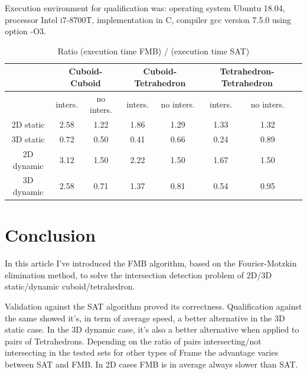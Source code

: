 \documentclass[12pt, a4paper]{article}
\begin{document}
\begin{itemize}
Execution environment for qualification was: operating system Ubuntu 18.04, processor Intel i7-8700T, implementation in C, compiler gcc version 7.5.0 using option -O3.

\begin{table}[htp]
\small
\begin{center}
\begin{tabular}{|c|c|c|c|c|c|c|c|}
\hline
 & \multicolumn{2}{|c|}{Cuboid-Cuboid} & \multicolumn{2}{|c|}{Cuboid-Tetrahedron} & \multicolumn{2}{|c|}{Tetrahedron-Tetrahedron}\\
\hline
 & inters. & no inters. & inters. & no inters. & inters. & no inters.\\
\hline
2D static & {\color[rgb]{1.0,0.0,0.0}2.58} & {\color[rgb]{1.0,0.0,0.0}1.22} & {\color[rgb]{1.0,0.0,0.0}1.86} & {\color[rgb]{1.0,0.0,0.0}1.29} & {\color[rgb]{1.0,0.0,0.0}1.33} & {\color[rgb]{1.0,0.0,0.0}1.32}\\
\hline
3D static & {\color[rgb]{0.0,0.0,1.0}0.72} & {\color[rgb]{0.0,0.0,1.0}0.50} & {\color[rgb]{0.0,0.0,1.0}0.41} & {\color[rgb]{0.0,0.0,1.0}0.66} & {\color[rgb]{0.0,0.0,1.0}0.24} & {\color[rgb]{0.0,0.0,1.0}0.89}\\
\hline
2D dynamic & {\color[rgb]{1.0,0.0,0.0}3.12} & {\color[rgb]{1.0,0.0,0.0}1.50} & {\color[rgb]{1.0,0.0,0.0}2.22} & {\color[rgb]{1.0,0.0,0.0}1.50} & {\color[rgb]{1.0,0.0,0.0}1.67} & {\color[rgb]{1.0,0.0,0.0}1.50}\\
\hline
3D dynamic & {\color[rgb]{1.0,0.0,0.0}2.58} & {\color[rgb]{0.0,0.0,1.0}0.71} & {\color[rgb]{1.0,0.0,0.0}1.37} & {\color[rgb]{0.0,0.0,1.0}0.81} & {\color[rgb]{0.0,0.0,1.0}0.54} & {\color[rgb]{0.0,0.0,1.0}0.95}\\
\hline
\end{tabular}
\end{center}
\caption{Ratio (execution time FMB) / (execution time SAT)}
\label{tbl:ratio}
\end{table}

\section{Conclusion}

In this article I've introduced the FMB algorithm, based on the Fourier-Motzkin elimination method, to solve the intersection detection problem of 2D/3D static/dynamic cuboid/tetrahedron.

Validation against the SAT algorithm proved its correctness. Qualification against the same showed it's, in term of average speed, a better alternative in the 3D static case. In the 3D dynamic case, it's also a better alternative when applied to pairs of Tetrahedrons. Depending on the ratio of pairs intersecting/not intersecting in the tested sets for other types of Frame the advantage varies between SAT and FMB. In 2D cases FMB is in average always slower than SAT.


\end{itemize}
\end{document}
